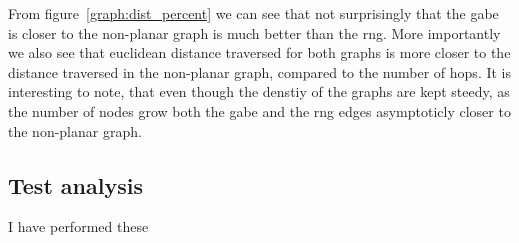 From figure~\ref{graph:dist_percent} we can see that not surprisingly that the \ac{gabe} is closer to the non-planar graph is much better than the \ac{rng}. More importantly we also see that euclidean distance traversed for both graphs is more closer to the distance traversed in the non-planar graph, compared to the number of hops. It is interesting to note, that even though the denstiy of the graphs are kept steedy, as the number of nodes grow both the \ac{gabe} and the \ac{rng} edges asymptoticly closer to the non-planar graph. 

\subsubsection{}






\subsection{Test analysis}


I have performed these


\subsection{}
\label{section:test_results_spanners}

